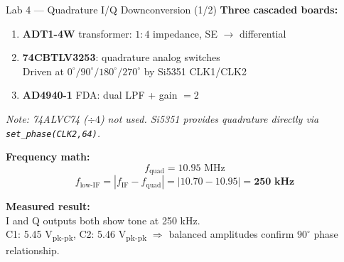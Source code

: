 \documentclass[aspectratio=169]{beamer}
\begin{document}
\begin{frame}{Lab 4 --- Quadrature I/Q Downconversion (1/2)}
\textbf{Three cascaded boards:}
\begin{enumerate}
  \item \textbf{ADT1-4W} transformer: $1\!:\!4$ impedance, SE $\to$ differential
  \item \textbf{74CBTLV3253}: quadrature analog switches\\
        Driven at $0^\circ/90^\circ/180^\circ/270^\circ$ by Si5351 CLK1/CLK2
  \item \textbf{AD4940-1} FDA: dual LPF + gain $= 2$
\end{enumerate}

\vspace{0.25cm}
\textit{\small Note: 74ALVC74 ($\div 4$) not used. Si5351 provides quadrature
directly via \texttt{set\_phase(CLK2,64)}.}

\vspace{0.35cm}
\textbf{Frequency math:}
\[
  f_\text{quad} = 10.95\text{ MHz}
\]
\[
  f_\text{low-IF} = |f_\text{IF} - f_\text{quad}|
  = |10.70 - 10.95| = \mathbf{250\text{ kHz}}
\]

\vspace{0.25cm}
\textbf{Measured result:}\\
I and Q outputs both show tone at 250 kHz.\\
C1: 5.45 V\textsubscript{pk-pk}, C2: 5.46 V\textsubscript{pk-pk} $\Rightarrow$ balanced amplitudes confirm $90^\circ$ phase relationship.
\end{frame}
\end{document}
